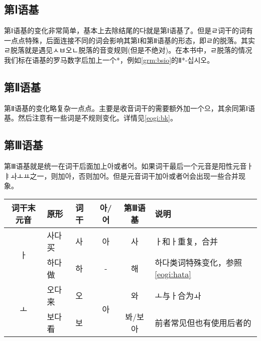 \subsection{第Ⅰ语基}
第Ⅰ语基的变化非常简单，基本上去除结尾的{\kr 다}就是第Ⅰ语基了。但是{\kr ㄹ}词干的词有一点点特殊，后面连接不同的词会影响其第Ⅰ和第Ⅱ语基的形态，即{\kr ㄹ}的脱落。其实{\kr ㄹ}脱落就是遇见{\kr ㅅㅂ오ㄴ}脱落的音变规则(但是不绝对)。在本书中，{\kr ㄹ}脱落的情况我们标在语基的罗马数字后加上一个*，例如\ref{grm:bsio}的{\kr Ⅱ*-십시오}。
\subsection{第Ⅱ语基}
第Ⅱ语基的变化略复杂一点点。主要是收音词干的需要额外加一个{\kr 으}，其余同第Ⅰ语基。然后注意有一些词是不规则变化。详情见\ref{eogi:bk}。
\subsection{第Ⅲ语基}
第Ⅲ语基就是统一在词干后面加上{\kr 아}或者{\kr 어}。如果词干最后一个元音是阳性元音{\kr ㅏㅑㅘㅗㅛ}之一，则加{\kr 아}，否则加{\kr 어}。但是元音词干加{\kr 아}或者{\kr 어}会出现一些合并现象。\\
\begin{tabular}{|c|l|l|c|c|l|}
	\hline
	词干末元音              & 原形   & 词干 &\kr  아/어                & 第Ⅲ语基 & 说明                         \\\hline
	\multirow{2}{*}{\kr ㅏ} & {\kr 사다} 买 & \kr 사  & \kr 아                  & \kr 사    & {\kr ㅏ}和{\kr ㅏ}重复，合并                   \\\cline{2-6}
	                   & {\kr 하다} 做 & \kr 하  & -                  & \kr 해    & {\kr 하다}类词特殊变化，参照\ref{eogi:hata} \\\hline
	\multirow{2}{*}{\kr ㅗ} & {\kr 오다} 来 & \kr 오  & \multirow{2}{*}{\kr 아} & \kr 와    & {\kr ㅗ}与{\kr ㅏ}合为{\kr ㅘ}                     \\\cline{2-3}\cline{5-6}
	                   & {\kr 보다} 看 & \kr 보  &                    & \kr 봐/보아 & 前者常见但也有使用后者的               \\\hline
\end{tabular}\\
